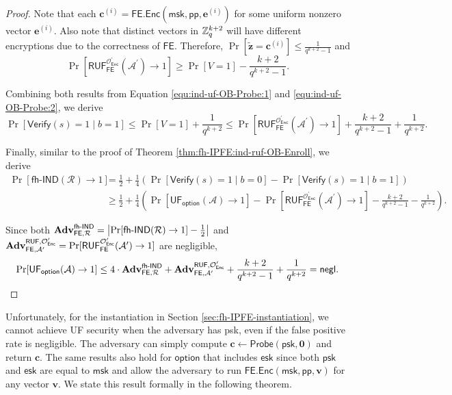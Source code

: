 \begin{proof}
\noindent Note that each $\mathbf{c}^{(i)} = \textsf{FE.Enc}(\textsf{msk}, \textsf{pp}, \mathbf{e}^{(i)})$ for some uniform nonzero vector $\mathbf{e}^{(i)}$. Also note that distinct vectors in $\mathbb{Z}_q^{k+2}$ will have different encryptions due to the correctness of $\textsf{FE}$. Therefore, $\Pr[\mathbf{\tilde{z}} = \mathbf{c}^{(i)}] \leq \frac{1}{q^{k+2} - 1}$ and
\[
	\Pr[\textsf{RUF}_\textsf{FE}^{\mathcal{O}^\prime_{\textsf{Enc}}}(\mathcal{A}^\prime) \to 1] \geq \Pr[V = 1] - \frac{k+2}{q^{k+2}-1}.
\]

\noindent Combining both results from Equation \ref{equ:ind-uf-OB-Probe:1} and \ref{equ:ind-uf-OB-Probe:2}, we derive
\[
	\Pr[\textsf{Verify}(s) = 1 \mid b = 1] \leq \Pr[V = 1] + \frac{1}{q^{k+2}} \leq \Pr[\textsf{RUF}_\textsf{FE}^{\mathcal{O}^\prime_{\textsf{Enc}}}(\mathcal{A}^\prime) \to 1] + \frac{k+2}{q^{k+2}-1} + \frac{1}{q^{k+2}}.
\]

Finally, similar to the proof of Theorem \ref{thm:fh-IPFE:ind-ruf-OB-Enroll}, we derive
\begin{align*}
	\Pr[\textsf{fh-IND}(\mathcal{R}) \to 1]
	&= \frac{1}{2} + \frac{1}{4} \left( \Pr[\textsf{Verify}(s) = 1 \mid b = 0] - \Pr[\textsf{Verify}(s) = 1 \mid b = 1] \right) \\
	&\geq \frac{1}{2} + \frac{1}{4} \left( \Pr[\textsf{UF}_\textsf{option}(\mathcal{A}) \to 1] - \Pr[\textsf{RUF}_\textsf{FE}^{\mathcal{O}^\prime_{\textsf{Enc}}}(\mathcal{A}^\prime) \to 1] - \frac{k+2}{q^{k+2}-1} - \frac{1}{q^{k+2}} \right).
\end{align*}

\noindent Since both $\mathbf{Adv}_{\textsf{FE}, \mathcal{R}}^\textsf{fh-IND} = \left| \Pr[\textsf{fh-IND}(\mathcal{R}) \to 1] - \frac{1}{2} \right|$ and $\mathbf{Adv}_{\textsf{FE}, \mathcal{A}^\prime}^{\textsf{RUF}, \mathcal{O}^\prime_{\textsf{Enc}}} = \Pr[\textsf{RUF}^{\mathcal{O}^\prime_{\textsf{Enc}}}_{\textsf{FE}}(\mathcal{A}^\prime) \to 1 ]$ are negligible,
\[
	\Pr[\textsf{UF}_\textsf{option}(\mathcal{A}) \to 1] \leq 4 \cdot \mathbf{Adv}_{\textsf{FE}, \mathcal{R}}^\textsf{fh-IND} + \mathbf{Adv}_{\textsf{FE}, \mathcal{A}^\prime}^{\textsf{RUF}, \mathcal{O}^\prime_{\textsf{Enc}}} + \frac{k+2}{q^{k+2}-1} + \frac{1}{q^{k+2}} = \mathsf{negl}.
\]

\end{proof}

Unfortunately, for the instantiation in Section \ref{sec:fh-IPFE-instantiation}, we cannot achieve UF security when the adversary has \textsf{psk}, even if the false positive rate is negligible. The adversary can simply compute $\mathbf{c} \gets \textsf{Probe}(\textsf{psk}, \mathbf{0})$ and return $\mathbf{c}$. The same results also hold for $\textsf{option}$ that includes $\textsf{esk}$ since both $\textsf{psk}$ and $\textsf{esk}$ are equal to $\textsf{msk}$ and allow the adversary to run $\textsf{FE.Enc}(\textsf{msk}, \textsf{pp}, \mathbf{v})$ for any vector $\mathbf{v}$. We state this result formally in the following theorem.

